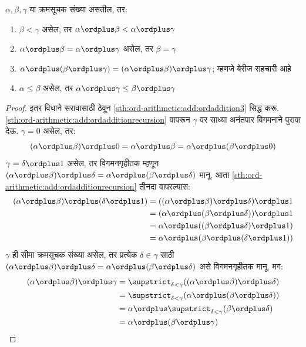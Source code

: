 \begin{lem}\label{sth:ord-arithmetic:add:ordinaladditionisnice}
$\alpha, \beta, \gamma$ या क्रमसूचक संख्या असतील, तर:
\begin{enumerate}
  \item\label{sth:ord-arithmetic:add:ordaddition1} $\beta < \gamma$ असेल, तर $\alpha
  \ordplus  \beta < \alpha \ordplus  \gamma$
  \item\label{sth:ord-arithmetic:add:ordaddition2} $\alpha \ordplus  \beta =
  \alpha\ordplus \gamma$ असेल, तर $\beta = \gamma$
  \item\label{sth:ord-arithmetic:add:ordaddition3} $\alpha \ordplus  (\beta \ordplus
  \gamma) = (\alpha \ordplus  \beta) \ordplus  \gamma$; म्हणजे बेरीज सहचारी आहे
  \item\label{sth:ord-arithmetic:add:ordaddition4} $\alpha \leq \beta$ असेल, तर $\alpha
  \ordplus  \gamma \leq \beta \ordplus \gamma$
\end{enumerate}
\end{lem}

\begin{proof}
इतर विधाने सरावासाठी ठेवून \ref{sth:ord-arithmetic:add:ordaddition3} सिद्ध करू. \ref{sth:ord-arithmetic:add:ordadditionrecursion} वापरून $\gamma$ वर साध्या अनंतपार विगमनाने पुरावा देऊ. $\gamma = 0$ असेल, तर:
\[
(\alpha \ordplus  \beta) \ordplus  0 = \alpha \ordplus  \beta  = \alpha \ordplus  (\beta \ordplus  0)
\]
$\gamma = \delta\ordplus 1$ असेल, तर विगमनगृहीतक म्हणून $(\alpha
\ordplus  \beta) \ordplus  \delta = \alpha \ordplus  (\beta \ordplus
\delta)$ मानू. आता \ref{sth:ord-arithmetic:add:ordadditionrecursion} तीनदा वापरल्यास:
\begin{align*}
  (\alpha \ordplus  \beta) \ordplus  (\delta \ordplus  1) & = ((\alpha \ordplus  \beta) \ordplus  \delta)\ordplus 1\\
  & = (\alpha \ordplus  (\beta \ordplus  \delta)) \ordplus  1\\
  & = \alpha \ordplus  ((\beta \ordplus  \delta)\ordplus 1)\\
  & = \alpha \ordplus  (\beta \ordplus  (\delta\ordplus 1))
\end{align*}
$\gamma$ ही सीमा क्रमसूचक संख्या असेल, तर प्रत्येक $\delta \in \gamma$ साठी $(\alpha \ordplus  \beta) \ordplus  \delta =
\alpha \ordplus  (\beta \ordplus  \delta)$ असे विगमनगृहीतक मानू. मग:
\begin{align*}
  (\alpha \ordplus  \beta) \ordplus  \gamma & = \supstrict_{\delta < \gamma}((\alpha \ordplus  \beta) \ordplus  \delta) \\
  &= \supstrict_{\delta < \gamma}(\alpha \ordplus  (\beta \ordplus  \delta))\\
  &= \alpha \ordplus  \supstrict_{\delta < \gamma}(\beta \ordplus  \delta)\\
  & = \alpha \ordplus  (\beta \ordplus  \gamma)
\end{align*}
\end{proof}

